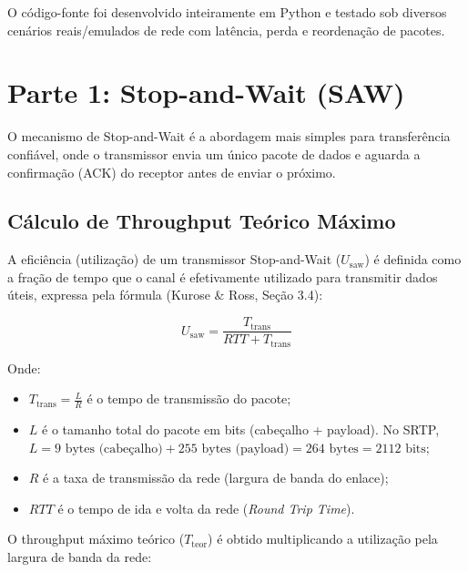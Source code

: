 \documentclass[12pt,a4paper]{article}
\begin{document}
O código-fonte foi desenvolvido inteiramente em Python e testado sob diversos cenários reais/emulados de rede com latência, perda e reordenação de pacotes.

\section{Parte 1: Stop-and-Wait (SAW)}

O mecanismo de Stop-and-Wait é a abordagem mais simples para transferência confiável, onde o transmissor envia um único pacote de dados e aguarda a confirmação (ACK) do receptor antes de enviar o próximo. 

\subsection{Cálculo de Throughput Teórico Máximo}
A eficiência (utilização) de um transmissor Stop-and-Wait ($U_{\text{saw}}$) é definida como a fração de tempo que o canal é efetivamente utilizado para transmitir dados úteis, expressa pela fórmula (Kurose \& Ross, Seção 3.4):

\begin{equation}
    U_{\text{saw}} = \frac{T_{\text{trans}}}{RTT + T_{\text{trans}}}
\end{equation}

Onde:
\begin{itemize}
    \item $T_{\text{trans}} = \frac{L}{R}$ é o tempo de transmissão do pacote;
    \item $L$ é o tamanho total do pacote em bits (cabeçalho + payload). No SRTP, $L = 9 \text{ bytes (cabeçalho)} + 255 \text{ bytes (payload)} = 264 \text{ bytes} = 2112 \text{ bits}$;
    \item $R$ é a taxa de transmissão da rede (largura de banda do enlace);
    \item $RTT$ é o tempo de ida e volta da rede (\textit{Round Trip Time}).
\end{itemize}

O throughput máximo teórico ($T_{\text{teor}}$) é obtido multiplicando a utilização pela largura de banda da rede:
\end{document}
